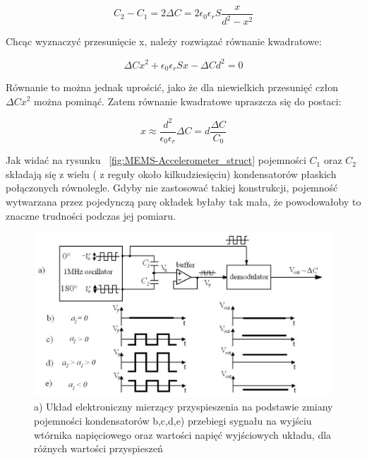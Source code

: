 \begin{equation}
	C_2 - C_1 = 2\Delta{C} = 2\epsilon_0\epsilon_rS\frac{x}{d^2 - x^2}
\end{equation}

Chcąc wyznaczyć przesunięcie x, należy rozwiązać równanie kwadratowe:

\begin{equation}
	\Delta{C}x^2 + \epsilon_0\epsilon_rSx - \Delta{C}d^2 = 0
\end{equation}

Równanie to można jednak uprościć, jako że dla niewielkich przesunięć człon $\Delta{C}x^2$ można pominąć. Zatem równanie kwadratowe upraszcza się do postaci:

\begin{equation}
	x \approx \frac{d^2}{\epsilon_0\epsilon_r}\Delta{C} = d\frac{\Delta{C}}{C_0}
	\label{x_to_c}
\end{equation}

Jak widać na rysunku ~\ref{fig:MEMS-Accelerometer_struct} pojemności $C_1$ oraz $C_2$ składają się z wielu ( z reguły około kilkudziesięciu)  kondensatorów płaskich połączonych równolegle. Gdyby nie zastosować takiej konstrukcji, pojemność wytwarzana przez pojedynczą parę okładek byłaby tak mała, że powodowałoby to znaczne trudności podczas jej pomiaru. 

\begin{figure}[H]
	\centering
	\includegraphics[scale=0.4]{Pictures/MEMS_accel_demod.png}
		\caption[Układ elektroniczny do pomiaru różnicy pojemności kondensatorów]{a) Układ elektroniczny mierzący przyspieszenia na podstawie zmiany pojemności kondensatorów b,c,d,e) przebiegi sygnału na wyjściu wtórnika napięciowego oraz wartości napięć wyjściowych układu, dla różnych wartości przyspieszeń }
	\label{fig:MEMS_accel_demod}
\end{figure}

